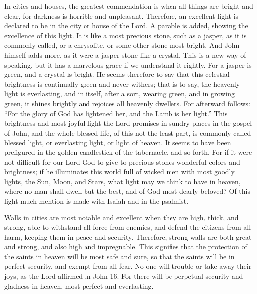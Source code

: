 In cities and houses, the greatest commendation is when all things are bright and clear, for darkness is horrible and unpleasant. Therefore, an excellent light is declared to be in the city or house of the Lord. A parable is added, showing the excellence of this light. It is like a most precious stone, such as a jasper, as it is commonly called, or a chrysolite, or some other stone most bright. And John himself adds more, as it were a jasper stone like a crystal. This is a new way of speaking, but it has a marvelous grace if we understand it rightly. For a jasper is green, and a crystal is bright. He seems therefore to say that this celestial brightness is continually green and never withers; that is to say, the heavenly light is everlasting, and in itself, after a sort, wearing green, and in growing green, it shines brightly and rejoices all heavenly dwellers. For afterward follows: “For the glory of God has lightened her, and the Lamb is her light.” This brightness and most joyful light the Lord promises in sundry places in the gospel of John, and the whole blessed life, of this not the least part, is commonly called blessed light, or everlasting light, or light of heaven. It seems to have been prefigured in the golden candlestick of the tabernacle, and so forth. For if it were not difficult for our Lord God to give to precious stones wonderful colors and brightness; if he illuminates this world full of wicked men with most goodly lights, the Sun, Moon, and Stars, what light may we think to have in heaven, where no man shall dwell but the best, and of God most dearly beloved? Of this light much mention is made with Isaiah and in the psalmist.

Walls in cities are most notable and excellent when they are high, thick, and strong, able to withstand all force from enemies, and defend the citizens from all harm, keeping them in peace and security. Therefore, strong walls are both great and strong, and also high and impregnable. This signifies that the protection of the saints in heaven will be most safe and sure, so that the saints will be in perfect security, and exempt from all fear. No one will trouble or take away their joys, as the Lord affirmed in John 16. For there will be perpetual security and gladness in heaven, most perfect and everlasting.

